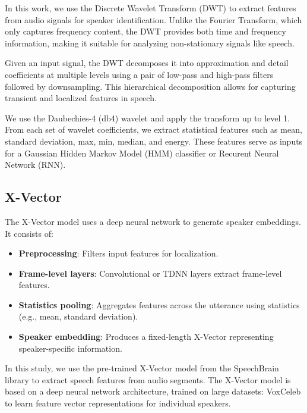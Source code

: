 \documentclass[conference]{IEEEtran}
\begin{document}
In this work, we use the Discrete Wavelet Transform (DWT) to extract features
from audio signals for speaker identification. Unlike the Fourier Transform,
which only captures frequency content, the DWT provides both time and frequency information, making it suitable for analyzing non-stationary signals like speech.

Given an input signal, the DWT decomposes it into approximation and detail
coefficients at multiple levels using a pair of low-pass and high-pass filters followed by downsampling. This hierarchical decomposition allows for capturing transient and localized features in speech.

We use the Daubechies-4 (db4) wavelet and apply the transform up to level 1.
From each set of wavelet coefficients, we extract statistical features such as mean, standard deviation, max, min, median, and energy. These features serve as inputs for a Gaussian Hidden Markov Model (HMM) classifier or Recurent Neural Network (RNN). \cite{tufekci2000dwt}















\subsection{X-Vector}

The X-Vector model uses a deep neural network to generate speaker embeddings. It consists of:

\begin{itemize} \item \textbf{Preprocessing}: Filters input features for localization.
    \item \textbf{Frame-level layers}: Convolutional or TDNN layers extract
          frame-level features. \item \textbf{Statistics pooling}: Aggregates
          features across the utterance using statistics (e.g., mean, standard deviation).
    \item \textbf{Speaker embedding}: Produces a fixed-length X-Vector
          representing speaker-specific information. \end{itemize}


In this study, we use the pre-trained X-Vector model from the SpeechBrain
library to extract speech features from audio segments. The X-Vector model
is based on a deep neural network architecture, trained on large
datasets: VoxCeleb to learn feature vector representations
for individual speakers.
\end{document}
